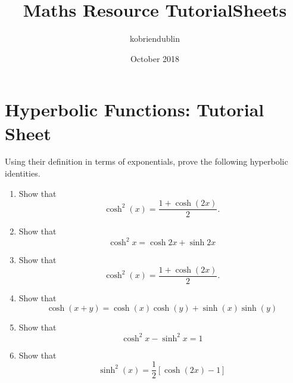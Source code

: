 \documentclass{article}
\title{Maths Resource TutorialSheets}
\author{kobriendublin }
\date{October 2018}
\begin{document}
\section*{Hyperbolic Functions: Tutorial Sheet}

Using their definition in terms of exponentials, prove the following hyperbolic identities.

\begin{enumerate}

	\item Show that  \[	\cosh^2(x) =  \frac{1 + \cosh(2x)}{2}.\]
	\item Show that \[\cosh^2 x = \cosh2x + \sinh2x\]
		\item Show that  \[	\cosh^2(x) =  \frac{1 + \cosh(2x)}{2}.\]
	
	\item Show that \[ \cosh(x+y) = \cosh(x)\cosh(y) + \sinh(x)\sinh(y)\]
	\item Show that \[\cosh^2 x - \sinh^2 x = 1\]
	\item Show that \[\sinh^2 (x) = \frac{1}{2}\left[\cosh(2x)-1\right]\]
	
\end{enumerate}
\end{document}
